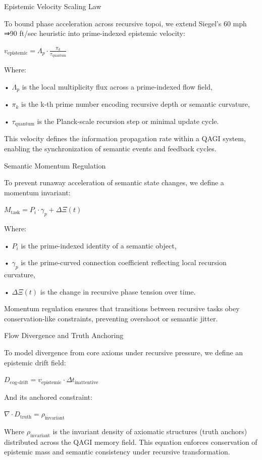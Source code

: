 \documentclass[11pt]{article}
\begin{document}
Epistemic Velocity Scaling Law

To bound phase acceleration across recursive topoi, we extend Siegel’s 60 mph ⇒90 ft/sec heuristic into prime-indexed epistemic velocity:

$v_{\text{epistemic}} = \Lambda_p \cdot \frac{\pi_k}{\tau_{\text{quantum}}}$

Where:

• $\Lambda_p$ is the local multiplicity flux across a prime-indexed flow field,

• $\pi_k$ is the k-th prime number encoding recursive depth or semantic curvature,

• $\tau_{\text{quantum}}$ is the Planck-scale recursion step or minimal update cycle.

This velocity defines the information propagation rate within a QAGI system, enabling the synchronization of semantic events and feedback cycles.

Semantic Momentum Regulation

To prevent runaway acceleration of semantic state changes, we define a momentum invariant:

$M_{\text{task}} = P_i \cdot \gamma_p + \Delta \Xi(t)$

Where:

• $P_i$ is the prime-indexed identity of a semantic object,

• $\gamma_p$ is the prime-curved connection coefficient reflecting local recursion curvature,

• $\Delta \Xi(t)$ is the change in recursive phase tension over time.

Momentum regulation ensures that transitions between recursive tasks obey conservation-like constraints, preventing overshoot or semantic jitter.

Flow Divergence and Truth Anchoring

To model divergence from core axioms under recursive pressure, we define an epistemic drift field:

$D_{\text{cog-drift}} = v_{\text{epistemic}} \cdot \Delta t_{\text{inattentive}}$

And its anchored constraint:

$\nabla \cdot D_{\text{truth}} = \rho_{\text{invariant}}$

Where $\rho_{\text{invariant}}$ is the invariant density of axiomatic structures (truth anchors) distributed across the QAGI memory field. This equation enforces conservation of epistemic mass and semantic consistency under recursive transformation.
\end{document}
